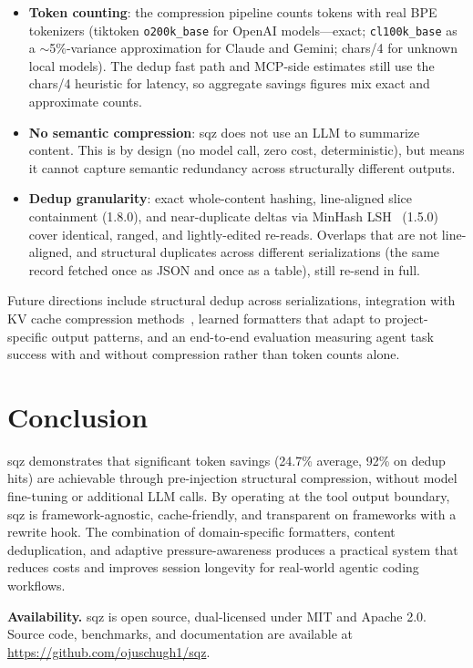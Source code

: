\documentclass[10pt,twocolumn]{article}
\begin{document}
\begin{itemize}
  \item \textbf{Token counting}: the compression pipeline counts tokens with real BPE tokenizers (tiktoken \texttt{o200k\_base} for OpenAI models---exact; \texttt{cl100k\_base} as a $\sim$5\%-variance approximation for Claude and Gemini; chars/4 for unknown local models). The dedup fast path and MCP-side estimates still use the chars/4 heuristic for latency, so aggregate savings figures mix exact and approximate counts.
  \item \textbf{No semantic compression}: sqz does not use an LLM to summarize content. This is by design (no model call, zero cost, deterministic), but means it cannot capture semantic redundancy across structurally different outputs.
  \item \textbf{Dedup granularity}: exact whole-content hashing, line-aligned slice containment (1.8.0), and near-duplicate deltas via MinHash LSH~\cite{minhash2025} (1.5.0) cover identical, ranged, and lightly-edited re-reads. Overlaps that are not line-aligned, and structural duplicates across different serializations (the same record fetched once as JSON and once as a table), still re-send in full.
\end{itemize}

Future directions include structural dedup across serializations, integration with KV cache compression methods~\cite{chen2025codecomp}, learned formatters that adapt to project-specific output patterns, and an end-to-end evaluation measuring agent task success with and without compression rather than token counts alone.

\section{Conclusion}

sqz demonstrates that significant token savings (24.7\% average, 92\% on dedup hits) are achievable through pre-injection structural compression, without model fine-tuning or additional LLM calls. By operating at the tool output boundary, sqz is framework-agnostic, cache-friendly, and transparent on frameworks with a rewrite hook. The combination of domain-specific formatters, content deduplication, and adaptive pressure-awareness produces a practical system that reduces costs and improves session longevity for real-world agentic coding workflows.

\medskip
\noindent\textbf{Availability.} sqz is open source, dual-licensed under MIT and Apache 2.0. Source code, benchmarks, and documentation are available at \url{https://github.com/ojuschugh1/sqz}.



\end{document}
